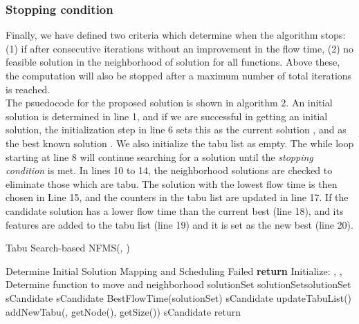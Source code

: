 \documentclass[conference]{IEEEtran}
\begin{document}
\subsubsection{Stopping condition} Finally, we have defined two criteria which determine when the algorithm stops: (1) if after  consecutive iterations without an improvement in the flow time, (2) no feasible solution in the neighborhood of solution  for all functions. Above these, the computation will also be stopped after a maximum number  of total iterations is reached.\\
\indent The psuedocode for the proposed solution is shown in algorithm 2. An initial solution is determined in line 1,  and if we are successful in getting an initial solution, the initialization step in line 6 sets this as the current solution , and as the best known solution . We also initialize the tabu list  as empty. The while loop starting at line 8 will continue searching for a solution until the \textit{stopping condition} is met. In lines 10 to 14, the neighborhood solutions are checked to eliminate those which are tabu. The solution with the lowest flow time is then chosen in Line 15, and the counters in the tabu list are updated in line 17. If the candidate solution has a lower flow time than the current best (line 18), and its features are added to the tabu list (line 19) and it is set as the new best (line 20).
\begin{algorithm}[t]
\caption{Tabu Search-based NFMS(, )}
\label{tscode}
\begin{algorithmic}[1]
\STATE Determine Initial Solution 
\STATE Mapping and Scheduling Failed
\STATE \textbf{return}
\ENDIF
\STATE Initialize: , , 
\STATE Determine function  to move and neighborhood 
\STATE solutionSet  
\STATE solutionSetsolutionSet  sCandidate
\ENDIF
\ENDFOR
\STATE sCandidate  BestFlowTime(solutionSet)
\STATE  sCandidate
\STATE updateTabuList()
\STATE addNewTabu(, getNode(), getSize())
\STATE  sCandidate
\ENDIF
\ENDWHILE
\STATE return 
\end{algorithmic}
\end{algorithm}
\end{document}
